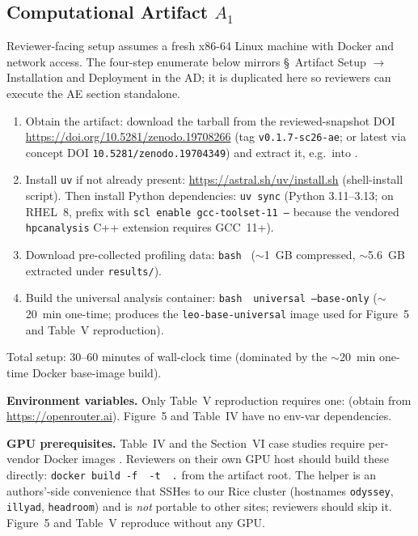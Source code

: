 \documentclass[conference]{IEEEtran}
\renewcommand{\arteval}[1]{%
    \setcounter{artifactCounter}{#1}%
    \subsection{Computational Artifact
        \texorpdfstring{$A_{#1}$}{A#1}}%
}
\begin{document}
\appendixAE

\arteval{1}

\artin

Reviewer-facing setup assumes a fresh x86-64 Linux machine with Docker and network access. The four-step enumerate below mirrors \S~Artifact Setup $\to$ Installation and Deployment in the AD; it is duplicated here so reviewers can execute the AE section standalone.

\begin{enumerate}
\item Obtain the artifact: download the tarball from the reviewed-snapshot DOI \url{https://doi.org/10.5281/zenodo.19708266} (tag \texttt{v0.1.7-sc26-ae}; or latest via concept DOI \texttt{10.5281/zenodo.19704349}) and extract it, e.g.\ into .
\item Install \texttt{uv} if not already present: \url{https://astral.sh/uv/install.sh} (shell-install script). Then install Python dependencies: \texttt{uv sync} (Python 3.11--3.13; on RHEL~8, prefix with \texttt{scl enable gcc-toolset-11 --} because the vendored \texttt{hpcanalysis} C++ extension requires GCC~11+).
\item Download pre-collected profiling data: \texttt{bash}~ ($\sim$1~GB compressed, $\sim$5.6~GB extracted under \texttt{results/}).
\item Build the universal analysis container: \texttt{bash}~~\texttt{universal --base-only} ($\sim$20~min one-time; produces the \texttt{leo-base-universal} image used for Figure~5 and Table~V reproduction).
\end{enumerate}

Total setup: 30--60 minutes of wall-clock time (dominated by the $\sim$20~min one-time Docker base-image build).

\textbf{Environment variables.} Only Table~V reproduction requires one:  (obtain from \url{https://openrouter.ai}). Figure~5 and Table~IV have no env-var dependencies.

\textbf{GPU prerequisites.} Table~IV and the Section~VI case studies require per-vendor Docker images . Reviewers on their own GPU host should build these directly: \texttt{docker build -f}~~\texttt{-t}~~\texttt{.} from the artifact root. The helper  is an authors'-side convenience that SSHes to our Rice cluster (hostnames \texttt{odyssey}, \texttt{illyad}, \texttt{headroom}) and is \emph{not} portable to other sites; reviewers should skip it. Figure~5 and Table~V reproduce without any GPU.
\end{document}
